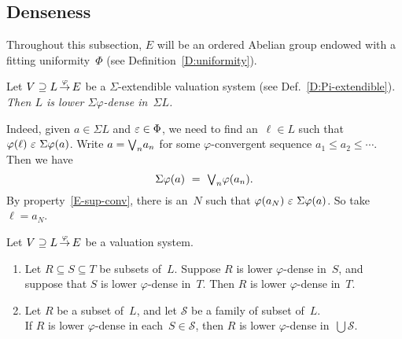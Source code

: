 \documentclass[main.tex]{subfiles}
\begin{document}
\subsection{Denseness}
\label{SS:dense}
Throughout this subsection,
$E$ will be an ordered Abelian group
endowed with a fitting uniformity~$\Phi$
(see Definition~\ref{D:uniformity}).
%
%
\begin{ex}
\label{E:sigma-dense}
Let $V \supseteq L\,\smash{\stackrel{\varphi}{\rightarrow}}\,E$
be a $\Sigma$-extendible valuation system
(see Def.~\ref{D:Pi-extendible}).
\emph{Then $L$ is lower $\Sigma\varphi$-dense in~$\Sigma L$.}

Indeed,
given $a\in \Sigma L$
and $\varepsilon \in \Phi$,
we need to find an~$\ell\in L$ 
such that $\varphi(\ell) \ \ve\ \Sigma\varphi(a)$.
Write $a=\textstyle{\bigvee}_n a_n$ for
some $\varphi$-convergent sequence $a_1 \leq a_2 \leq \dotsb$.
Then we have
\begin{equation*}
\Sigma\varphi(a)\ =\ \textstyle{\bigvee}_n \varphi(a_n).
\end{equation*}
By property~\ref{E-sup-conv},
there is an~$N$ such that $\varphi(a_N) \ \ve\ \Sigma\varphi(a)$.
So take $\ell =a_N$.
\end{ex}
%
%
\begin{lem}
\label{L:ldense-prop}
Let $V \supseteq L\,\smash{\stackrel{\varphi}{\rightarrow}}\,E$ be a valuation system.
\begin{enumerate}
\item
\label{L:ldense-prop-1}
Let $R\subseteq S\subseteq T$ be subsets of~$L$.
Suppose $R$ is lower $\varphi$-dense in~$S$,
and suppose that $S$ is lower $\varphi$-dense in~$T$.
Then $R$ is lower $\varphi$-dense in~$T$.

\item
\label{L:ldense-prop-2}
Let $R$ be a subset of~$L$,
and let $\mathcal S$ be a family of subset of~$L$.\\
If $R$ is lower $\varphi$-dense in each~$S\in \mathcal{S}$,
then $R$ is lower $\varphi$-dense in~$\bigcup \mathcal{S}$.
\end{enumerate}
\end{lem}
\end{document}
